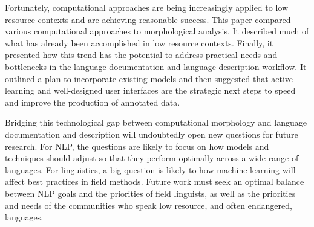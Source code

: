 \documentclass[12pt]{article}
\begin{document}
Fortunately, computational approaches are being increasingly applied to low resource contexts and are achieving reasonable success. This paper compared various computational approaches to morphological analysis. It described much of what has already been accomplished in low resource contexts. Finally, it presented how this trend has the potential to address practical needs and bottlenecks in the language documentation and language description workflow. It outlined a plan to incorporate existing models and then suggested that active learning and well-designed user interfaces are the strategic next steps to speed and improve the production of annotated data. 

Bridging this technological gap between computational morphology and language documentation and description will undoubtedly open new questions for future research. For NLP, the questions are likely to focus on how models and techniques should adjust so that they perform optimally across a wide range of languages. For linguistics, a big question is likely to how machine learning will affect best practices in field methods. Future work must seek an optimal balance between NLP goals and the priorities of field linguists, as well as the priorities and needs of the communities who speak low resource, and often endangered, languages. 

\newpage



\end{document}

